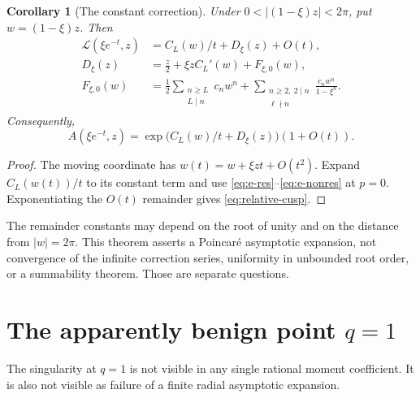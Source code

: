 \documentclass[11pt,a4paper]{article}
\numberwithin{equation}{section}
\newtheorem{corollary}[theorem]{Corollary}
\theoremstyle{definition}
\theoremstyle{remark}
\newcommand{\LL}{\mathcal L}
\begin{document}
\begin{corollary}[The constant correction]\label{cor:constant}
Under \(0<|(1-\xi)z|<2\pi\), put \(w=(1-\xi)z\). Then
\begin{align}
 \LL(\xi e^{-t},z)&=C_L(w)/t+D_\xi(z)+O(t),\label{eq:constant-correction}\\
 D_\xi(z)&=\frac z2+\xi zC_L'(w)+F_{\xi,0}(w),\label{eq:D}\\
 F_{\xi,0}(w)&=\frac12\sum_{\substack{n\ge L\\L\mid n}}c_nw^n
 +\sum_{\substack{n\ge2,\ 2\mid n\\\ell\nmid n}}
          \frac{c_nw^n}{1-\xi^n}.\label{eq:Fzero}
\end{align}
Consequently,
\begin{equation}\label{eq:relative-cusp}
 A(\xi e^{-t},z)=\exp\bigl(C_L(w)/t+D_\xi(z)\bigr)(1+O(t)).
\end{equation}
\end{corollary}
\begin{proof}
The moving coordinate has \(w(t)=w+\xi zt+O(t^2)\). Expand \(C_L(w(t))/t\) to its constant term and use \eqref{eq:e-res}--\eqref{eq:e-nonres} at \(p=0\). Exponentiating the \(O(t)\) remainder gives \eqref{eq:relative-cusp}.
\end{proof}

The remainder constants may depend on the root of unity and on the distance from \(|w|=2\pi\). This theorem asserts a Poincar\'e asymptotic expansion, not convergence of the infinite correction series, uniformity in unbounded root order, or a summability theorem. Those are separate questions.

\section{The apparently benign point \texorpdfstring{\(q=1\)}{q=1}}
The singularity at \(q=1\) is not visible in any single rational moment coefficient. It is also not visible as failure of a finite radial asymptotic expansion.
\end{document}
